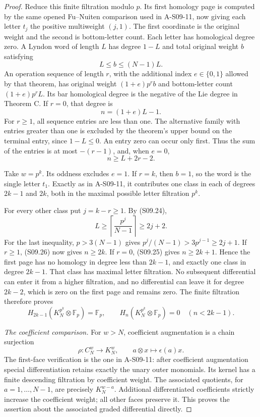 \begin{proof}
Reduce this finite filtration modulo $p$.  Its first homology
page is computed by the same opened Fu--Nuiten comparison
used in A-S09-11, now giving each letter $t_j$ the positive
multiweight $(j,1)$.  The first coordinate is the original
weight and the second is bottom-letter count.  Each letter
has homological degree zero.  A Lyndon word of length $L$
has degree $1-L$ and total original weight $b$ satisfying
\[
                     L\leq b\leq(N-1)L.
 \tag{S09.24}
\]
An operation sequence of length $r$, with the additional
index $e\in\{0,1\}$ allowed by that theorem, has original
weight $(1+e)p^r b$ and bottom-letter count
$(1+e)p^r L$.  Its bar homological degree is the negative
of the Lie degree in Theorem C.  If $r=0$, that degree is
\[
                          n=(1+e)L-1.                \tag{S09.25}
\]
For $r\geq1$, all sequence entries are less than one.
The alternative family with entries greater than one is
excluded by the theorem's upper bound on the terminal
entry, since $1-L\leq0$.  An entry zero can occur only
first.  Thus the sum of the entries is at most $-(r-1)$,
and, when $e=0$,
\[
                          n\geq L+2r-2.              \tag{S09.26}
\]

Take $w=p^k$.  Its oddness excludes $e=1$.  If $r=k$,
then $b=1$, so the word is the single letter $t_1$.
Exactly as in A-S09-11, it contributes one class in each
of degrees $2k-1$ and $2k$, both in the maximal possible
letter filtration $p^k$.

For every other class put $j=k-r\geq1$.  By (S09.24),
\[
 L\geq\left\lceil\frac{p^j}{N-1}\right\rceil
       \geq2j+2.
 \tag{S09.27}
\]
For the last inequality, $p>3(N-1)$ gives
$p^j/(N-1)>3p^{j-1}\geq2j+1$.
If $r\geq1$, (S09.26) now gives $n\geq2k$.
If $r=0$, (S09.25) gives $n\geq2k+1$.
Hence the first page has no homology in degree less than
$2k-1$, and exactly one class in degree $2k-1$.
That class has maximal letter filtration.  No subsequent
differential can enter it from a higher filtration, and no
differential can leave it for degree $2k-2$, which is zero
on the first page and remains zero.  The finite filtration
therefore proves
\[
 H_{2k-1}(K_N^{p^k}\otimes\mathbb F_p)=\mathbb F_p,
 \qquad
 H_n(K_N^{p^k}\otimes\mathbb F_p)=0\quad(n<2k-1).
 \tag{S09.28}
\]

\emph{The coefficient comparison.}
For $w>N$, coefficient augmentation is a chain surjection
\[
 \rho:C_N^w\longrightarrow K_N^w,\qquad
       a\otimes x\longmapsto\epsilon(a)x.
 \tag{S09.29}
\]
The first-face verification is the one in A-S09-11:
after coefficient augmentation special differentiation
retains exactly the unary outer monomials.  Its kernel
has a finite descending filtration by coefficient weight.
The associated quotients, for $a=1,\ldots,N-1$, are
precisely $K_N^{w-a}$.  Additional differentiated
coefficients strictly increase the coefficient weight;
all other faces preserve it.  This proves the assertion
about the associated graded differential directly.


\end{proof}
